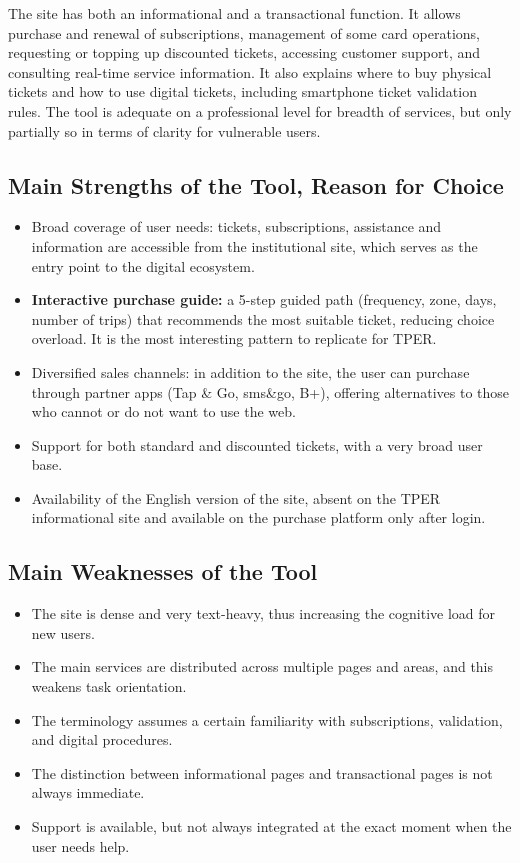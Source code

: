 ﻿\documentclass[11pt,a4paper]{article}
\begin{document}
\noindent The site has both an informational and a transactional function. It allows purchase and renewal of subscriptions, management of some card operations, requesting or topping up discounted tickets, accessing customer support, and consulting real-time service information. It also explains where to buy physical tickets and how to use digital tickets, including smartphone ticket validation rules. The tool is adequate on a professional level for breadth of services, but only partially so in terms of clarity for vulnerable users. 

\subsection*{Main Strengths of the Tool, Reason for Choice}

\begin{itemize}
    \item Broad coverage of user needs: tickets, subscriptions,
    assistance and information are accessible from the institutional
    site, which serves as the entry point to the digital ecosystem.
    \item \textbf{Interactive purchase guide:} a 5-step guided path
    (frequency, zone, days, number of trips) that recommends the
    most suitable ticket, reducing choice overload. It is the most
    interesting pattern to replicate for TPER.
    \item Diversified sales channels: in addition to the site, the user can
    purchase through partner apps (Tap \& Go, sms\&go, B+), offering
    alternatives to those who cannot or do not want to use the web.
    \item Support for both standard and discounted tickets, with a very
    broad user base.
    \item Availability of the English version of the site, absent on
    the TPER informational site and available on the purchase platform
    only after login.
\end{itemize}

\subsection*{Main Weaknesses of the Tool}

\begin{itemize}
    \item The site is dense and very text-heavy, thus increasing the cognitive load for new users.
    \item The main services are distributed across multiple pages and areas, and this weakens task orientation.
    \item The terminology assumes a certain familiarity with subscriptions, validation, and digital procedures.
    \item The distinction between informational pages and transactional pages is not always immediate.
    \item Support is available, but not always integrated at the exact moment when the user needs help.
\end{itemize}
\end{document}

